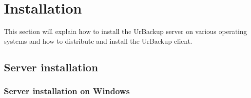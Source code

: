 \documentclass[a4paper,10pt]{article}
\begin{document}
\section{Installation}
\label{installation}

This section will explain how to install the UrBackup server on various operating
systems and how to distribute and install the UrBackup client.

\subsection{Server installation}

\subsubsection{Server installation on Windows}
\end{document}
